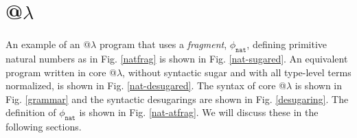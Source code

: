 \section{@$\lambda$}\label{theory}
\newcommand{\F}[1]{{\sf #1}~}
\newcommand{\FF}[1]{{\sf #1}}
\newcommand{\Q}{\FF{Arg}}
\renewcommand{\tnil}[1]{[]}
An example of an @$\lambda$ program that uses a \emph{fragment}, $\phi_{\texttt{nat}}$, defining primitive natural numbers as in Fig. \ref{natfrag} is shown in Fig. \ref{nat-sugared}. An equivalent program written in core @$\lambda$, without syntactic sugar and with all type-level terms normalized, is shown in Fig. \ref{nat-desugared}. The syntax of core @$\lambda$ is shown in Fig. \ref{grammar} and the syntactic desugarings are shown in Fig. \ref{desugaring}. The definition of $\phi_{\texttt{nat}}$ is shown in Fig. \ref{nat-atfrag}. We will discuss these in the following sections.

